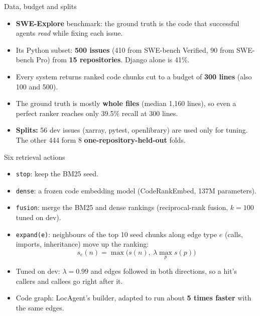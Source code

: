 \documentclass{beamer}
\newcommand{\acn}[1]{\texttt{#1}}
\begin{document}
\begin{frame}{Data, budget and splits}
  \begin{itemize}
    \item \textbf{SWE-Explore} benchmark: the ground truth is the code that successful agents \emph{read} while fixing each issue.
    \item Its Python subset: \textbf{500 issues} (410 from SWE-bench Verified, 90 from SWE-bench Pro) from \textbf{15 repositories}. Django alone is 41\%.
    \item Every system returns ranked code chunks cut to a budget of \textbf{300 lines} (also 100 and 500).
    \item The ground truth is mostly \textbf{whole files} (median 1,160 lines), so even a perfect ranker reaches only 39.5\% recall at 300 lines.
    \item \textbf{Splits:} 56 dev issues (xarray, pytest, openlibrary) are used only for tuning. The other 444 form 8 \textbf{one-repository-held-out} folds.
  \end{itemize}
\end{frame}

\begin{frame}{Six retrieval actions}
  \begin{itemize}
    \item \acn{stop}: keep the BM25 seed.
    \item \acn{dense}: a frozen code embedding model (CodeRankEmbed, 137M parameters).
    \item \acn{fusion}: merge the BM25 and dense rankings (reciprocal-rank fusion, $k=100$ tuned on dev).
    \item \acn{expand(e)}: neighbours of the top 10 seed chunks along edge type $e$ (calls, imports, inheritance) move up the ranking:
      \[ s_e(n) = \max\big(s(n),\ \lambda \max_{p} s(p)\big) \]
    \item Tuned on dev: $\lambda = 0.99$ and edges followed in both directions, so a hit's callers and callees go right after it.
    \item Code graph: LocAgent's builder, adapted to run about \textbf{5 times faster} with the same edges.
  \end{itemize}
\end{frame}
\end{document}
